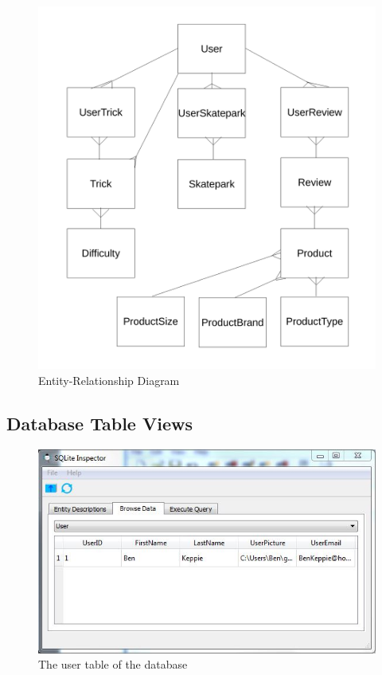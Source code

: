 \begin{figure}[H]
    \includegraphics[width=\textwidth]{./Design/EntityRelationships2.pdf}
    \caption{Entity-Relationship Diagram} \label{fig:Entity Diagram}
\end{figure}







\subsection{Database Table Views}

\begin{figure}[H]
    \includegraphics[width=\textwidth]{./Maintenance/Figures/UserTable.jpg}
    \caption{The user table of the database} \label{fig:User Table}
\end{figure}

